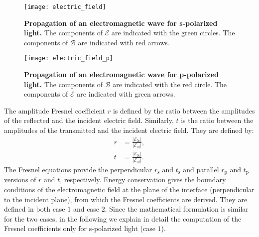 \begin{figure}[t]
 \label{fig:electric_field}
     \begin{center}
     \texttt{[image: electric\_field]}
     \end{center}
     \caption{\textbf{Propagation of an electromagnetic wave for s-polarized light.} The components of $\boldsymbol{\mathcal{E}}$ are indicated with the green circles.
The components of $\boldsymbol{\mathcal{B}}$ are indicated with red arrows.}
\label{fig:electric_field}
 \end{figure}
\begin{figure}[t]
 \label{fig:electric_field_p}
     \begin{center}
     \texttt{[image: electric\_field\_p]}
     \end{center}
 \caption{\textbf{Propagation of an electromagnetic wave for p-polarized light.} The components of $\boldsymbol{\mathcal{B}}$ are indicated with the red circle.
The components of $\boldsymbol{\mathcal{E}}$ are indicated with green arrows.}
\label{fig:electric_field_p}
 \end{figure}
The amplitude Fresnel coefficient $r$ is defined by the ratio between the amplitudes of the reflected and the incident electric field. Similarly, $t$ is the ratio between the amplitudes of the transmitted and the incident electric field. They are defined by:
\begin{equation}
\begin{split}
r & =\frac{|\boldsymbol{\mathcal{E}}_{0 \textrm{r}}|}{|\boldsymbol{\mathcal{E}}_{0\textrm{i}}|}, \\
t & =\frac{|\boldsymbol{\mathcal{E}}_{0 \textrm{t}}|}{|\boldsymbol{\mathcal{E}}_{0\textrm{i}}|}.
\end{split}
\end{equation}
The Fresnel equations provide the perpendicular $r_\textrm{s}$ and $t_\textrm{s}$ and parallel $r_\textrm{p}$ and $t_\textrm{p}$ versions of $r$ and $t$, respectively.
Energy conservation gives the boundary conditions of the electromagnetic field at the plane of the interface (perpendicular to the incident plane), from which the Fresnel coefficients are derived. They are defined in both case $1$ and case $2$. Since the mathematical formulation is similar for the two cases, in the following we explain in detail the computation of the Fresnel coefficients only for s-polarized light (case $1$).\\ 

